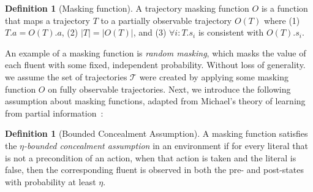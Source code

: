 \documentclass{article}
\theoremstyle{plain}
\theoremstyle{definition}
\newtheorem{definition}[theorem]{Definition}
\theoremstyle{remark}
\theoremstyle{observation}
\newcommand{\roni}[1]{ }
\begin{document}


\begin{definition}[Masking function]
A trajectory {masking function} $O$ is a function that maps a trajectory $T$ to a partially observable trajectory $O(T)$ where 
(1) $T.a=O(T).a$, 
(2) $|T|=|O(T)|$,
and (3) $\forall i: T.s_i$ is consistent with $O(T).s_i$. 
\end{definition}
An example of a masking function is \emph{random masking}, which masks the value of each fluent with some fixed, independent probability. 
Without loss of generality. we assume the set of trajectories $\mathcal{T}$ were created by applying some masking function $O$ on fully observable trajectories. 
Next, we introduce the following assumption about masking functions, adapted from Michael's theory of learning from partial information~\cite{michael2010partialObservability}:
\begin{definition}[Bounded Concealment Assumption]
A masking function satisfies the {\em $\eta$-bounded concealment assumption} in an environment if for every literal that is not a precondition of an action, when that action is taken and the literal is false, then the corresponding fluent is observed in both the pre- and post-states with probability at least $\eta$. 

\end{definition}
\end{document}
